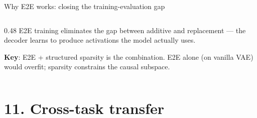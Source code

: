 \documentclass[aspectratio=169,11pt]{beamer}
\begin{document}
\begin{frame}{Why E2E works: closing the training-evaluation gap}
\begin{columns}[T]
\begin{column}{0.48\textwidth}
\vspace{0.4em}
{\small E2E training eliminates the gap between additive and replacement --- the decoder learns to produce activations the model actually uses.}

\vspace{0.3em}
{\small \textbf{Key}: E2E + structured sparsity is the combination. E2E alone (on vanilla VAE) would overfit; sparsity constrains the causal subspace.}
\end{column}
\end{columns}
\end{frame}

\hypertarget{sec11}{}
\section{11. Cross-task transfer}
\end{document}
